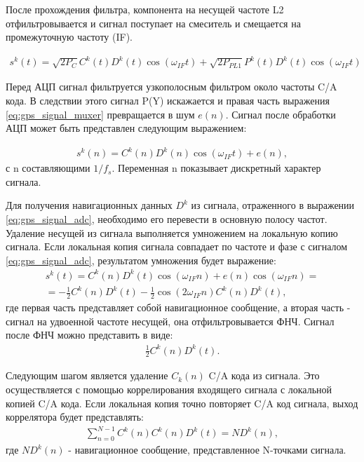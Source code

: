 После прохождения фильтра, компонента на несущей частоте L2 отфильтровывается и сигнал поступает на смеситель и смещается на
промежуточную частоту (IF).

\begin{eqnarray}
s^k(t) =	\sqrt{2P_C} C^k(t) D^k(t) \cos(\omega_{IF} t) +
		\sqrt{2P_{PL1}} P^k(t) D^k(t) \cos(\omega_{IF} t)
\label{eq:gps_signal_muxer}
\end{eqnarray}

Перед АЦП сигнал фильтруется узкополосным фильтром около частоты C/A кода. В следствии этого сигнал P(Y) искажается и правая часть
выражения \ref{eq:gps_signal_muxer} превращается в шум ${e(n)}$. Сигнал после обработки АЦП может быть представлен следующим
выражением:

\begin{eqnarray}
s^k(n) =	C^k(n) D^k(n) \cos(\omega_{IF} t) + e(n),
\label{eq:gps_signal_adc}
\end{eqnarray}
с n составляющими ${1/f_s}$. Переменная n показывает дискретный характер сигнала.

Для получения навигационных данных ${D^k}$ из сигнала, отраженного в выражении \ref{eq:gps_signal_adc}, необходимо его 
перевести в основную полосу частот. Удаление несущей из сигнала выполняется умножением на локальную копию сигнала.
Если локальная копия сигнала совпадает по частоте и фазе с сигналом \ref{eq:gps_signal_adc}, результатом умножения 
будет выражение:
\begin{eqnarray}
s^k(t)	=	C^k(n) D^k(t) \cos(\omega_{IF} n) + e(n) \cos(\omega_{IF} n) = \nonumber \\
	=	-\frac{1}{2}C^k(n) D^k(t) - \frac{1}{2}\cos(2\omega_{IF} n)C^k(n) D^k(t),
\label{eq:gps_signal_lpf}
\end{eqnarray}
где первая часть представляет собой навигационное сообщение, а вторая часть - сигнал на удвоенной частоте несущей, она
отфильтровывается ФНЧ. Сигнал после ФНЧ можно представить в виде:
\begin{eqnarray}
\frac{1}{2}C^k(n) D^k(t).
\label{eq:gps_signal_ca}
\end{eqnarray}

Следующим шагом является удаление ${C_k(n)}$ C/A кода из сигнала. Это осуществляется с помощью коррелирования 
входящего сигнала с локальной копией C/A кода. Если локальная копия точно повторяет C/A код сигнала, 
выход коррелятора будет представлять:
\begin{eqnarray}
\sum_{n=0}^{N-1} C^k(n) C^k(n) D^k(t) = ND^k(n),
\label{eq:gps_signal_ca}
\end{eqnarray}
где ${ND^k(n)}$ - навигационное сообщение, представленное N-точками сигнала.

